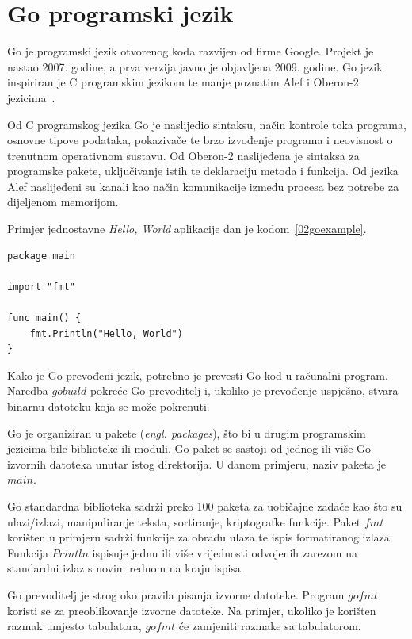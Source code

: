 \section{Go programski jezik}
Go je programski jezik otvorenog koda razvijen od firme Google. Projekt je nastao 2007. godine, a
prva verzija javno je objavljena 2009. godine. Go jezik inspiriran je C programskim jezikom te manje
poznatim Alef i Oberon-2 jezicima~\citep{donovan2015go}.

Od C programskog jezika Go je naslijedio sintaksu, način kontrole toka programa, osnovne tipove
podataka, pokazivače te brzo izvođenje programa i neovisnost o trenutnom operativnom sustavu.
Od Oberon-2 naslijeđena je sintaksa za programske pakete, uključivanje istih te deklaraciju metoda
i funkcija. Od jezika Alef naslijeđeni su kanali kao način komunikacije između procesa bez potrebe
za dijeljenom memorijom.

Primjer jednostavne \textit{Hello, World} aplikacije dan je kodom~\ref{02goexample}.

\begin{lstlisting}[float=h]
package main

import "fmt"

func main() {
    fmt.Println("Hello, World")
}
\end{lstlisting}

Kako je Go prevođeni jezik, potrebno je prevesti Go kod u računalni program. Naredba $go build$
pokreće Go prevoditelj i, ukoliko je prevođenje uspješno, stvara binarnu datoteku koja se može
pokrenuti.

Go je organiziran u pakete (\textit{engl. packages}), što bi u drugim programskim jezicima bile
biblioteke ili moduli. Go paket se sastoji od jednog ili više Go izvornih datoteka unutar istog
direktorija. U danom primjeru, naziv paketa je $main$.

Go standardna biblioteka sadrži preko 100 paketa za uobičajne zadaće kao što su ulazi/izlazi,
manipuliranje teksta, sortiranje, kriptografke funkcije. Paket $fmt$ korišten u primjeru sadrži
funkcije za obradu ulaza te ispis formatiranog izlaza. Funkcija $Println$ ispisuje jednu ili više
vrijednosti odvojenih zarezom na standardni izlaz s novim rednom na kraju ispisa.

Go prevoditelj je strog oko pravila pisanja izvorne datoteke. Program $gofmt$ koristi se za
preoblikovanje izvorne datoteke. Na primjer, ukoliko je korišten razmak umjesto tabulatora, $gofmt$
će zamjeniti razmake sa tabulatorom.


